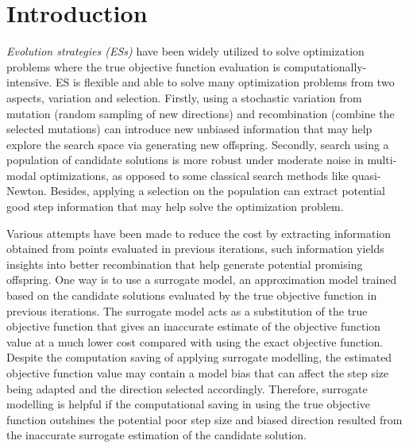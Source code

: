 \section{Introduction}

\textit{Evolution strategies (ESs)} have been widely utilized to solve optimization problems where the true objective function evaluation is computationally-intensive. ES is flexible and able to solve many optimization problems from two aspects, variation and selection. Firstly, using a stochastic variation from mutation (random sampling of new directions) and recombination (combine the selected mutations) can introduce new unbiased information that may help explore the search space via generating new offspring. Secondly, search using a population of candidate solutions is more robust under moderate noise in multi-modal optimizations, as opposed to some classical search methods like quasi-Newton. Besides, applying a selection on the population can extract potential good step information that may help solve the optimization problem. 

Various attempts have been made to reduce the cost by extracting information obtained from points evaluated in previous iterations, such information yields insights into better recombination that help generate potential promising offspring. One way is to use a surrogate model, an approximation model trained based on the candidate solutions evaluated by the true objective function in previous iterations. The surrogate model acts as a substitution of the true objective function that gives an inaccurate estimate of the objective function value at a much lower cost compared with using the exact objective function. Despite the computation saving of applying surrogate modelling, the estimated objective function value may contain a model bias that can affect the step size being adapted and the direction selected accordingly. Therefore, surrogate modelling is helpful if the computational saving in using the true objective function outshines the potential poor step size and biased direction resulted from the inaccurate surrogate estimation of the candidate solution. 

